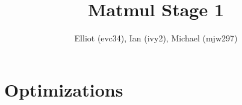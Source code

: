 \documentclass{hw}
\title{Matmul Stage 1}
\author{Elliot (evc34), Ian (ivy2), Michael (mjw297)}
\begin{document}
  \maketitle
  
  \section{Optimizations}\label{sec:opt}
  
  
  
  
  
  
\end{document}
